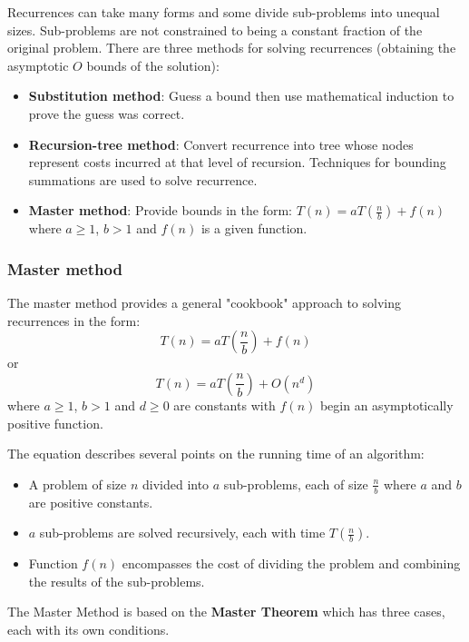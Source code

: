 \documentclass[10pt,a4paper]{article}
\begin{document}
Recurrences can take many forms and some divide sub-problems into unequal sizes. Sub-problems are
not constrained to being a constant fraction of the original problem. There are three methods for
solving recurrences (obtaining the asymptotic $O$ bounds of the solution):
\begin{itemize}
    \item \textbf{Substitution method}: Guess a bound then use mathematical induction to prove the
    guess was correct.
    \item \textbf{Recursion-tree method}: Convert recurrence into tree whose nodes represent costs
    incurred at that level of recursion. Techniques for bounding summations are used to solve recurrence.
    \item \textbf{Master method}: Provide bounds in the form: $T(n)=aT\left(\frac{n}{b}\right)+f(n)$
    where $a \geq 1$, $b>1$ and $f(n)$ is a given function.
\end{itemize} 

\subsubsection{Master method}

The master method provides a general "cookbook" approach to solving recurrences in the form:
$$
    T(n)=aT\left(\frac{n}{b}\right)+f(n)
$$
or 
$$
    T(n)=aT\left(\frac{n}{b}\right)+O(n^d)
$$
where $a\geq 1$, $b>1$ and $d\geq 0$ are constants with $f(n)$ begin an asymptotically positive function. \par 

The equation describes several points on the running time of an algorithm:
\begin{itemize}
    \item A problem of size $n$ divided into $a$ sub-problems, each of size $\frac{n}{b}$ where $a$ and $b$ are positive constants.
    \item $a$ sub-problems are solved recursively, each with time $T\left(\frac{n}{b}\right)$.
    \item Function $f(n)$ encompasses the cost of dividing the problem and combining the results of
    the sub-problems.
\end{itemize}

The Master Method is based on the \textbf{Master Theorem} which has three cases, each with its own
conditions.
\end{document}
